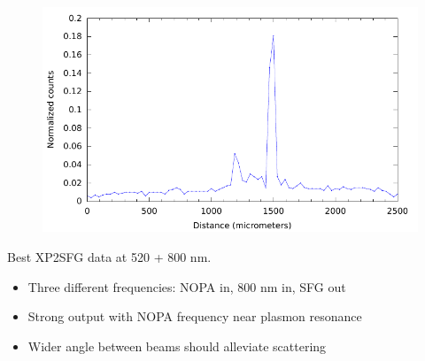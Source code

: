 \documentclass{beamer}
\begin{document}
\begin{frame}
\begin{center}
\begin{figure}
\includegraphics[height=0.55\textheight]{au_sfg_550+800_best}
\end{figure}
\end{center}
\begin{block}{Best XP2SFG data at 520 + 800 nm.}
\begin{itemize}
\item Three different frequencies: NOPA in, 800 nm in, SFG out
\item Strong output with NOPA frequency near plasmon resonance
\item Wider angle between beams should alleviate scattering
\end{itemize}
\end{block}
\end{frame}
\end{document}
